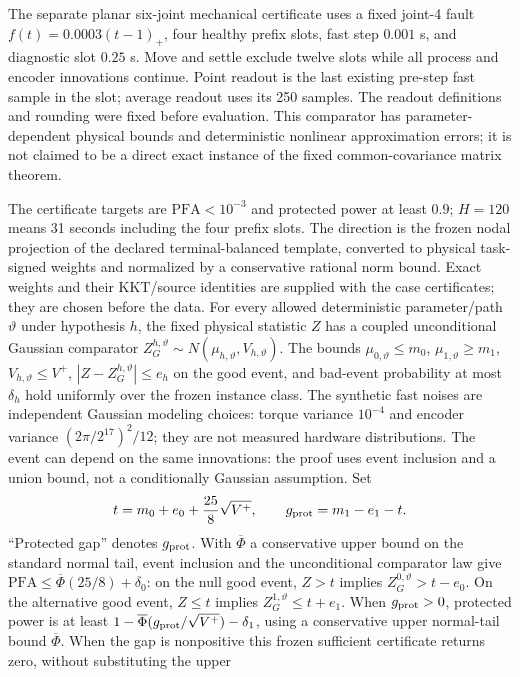 The separate planar six-joint mechanical certificate uses a fixed joint-4
fault $f(t)=0.0003(t-1)_+$, four healthy prefix slots, fast step $0.001$ s,
and diagnostic slot $0.25$ s. Move and settle exclude twelve slots while
all process and encoder innovations continue. Point readout is the last
existing pre-step fast sample in the slot; average readout uses its 250 samples.
The readout definitions and rounding were fixed before evaluation.
This comparator has parameter-dependent physical bounds and deterministic
nonlinear approximation errors; it is not claimed to be a direct exact
instance of the fixed common-covariance matrix theorem.


The certificate targets are $\mathrm{PFA}<10^{-3}$ and protected power
at least $0.9$; $H=120$ means 31 seconds including the four prefix slots.
The direction is the frozen nodal projection of the declared terminal-balanced
template, converted to physical task-signed weights and normalized by a
conservative rational norm bound. Exact weights and their KKT/source identities
are supplied with the case certificates; they are chosen before the data.
For every allowed deterministic parameter/path $\vartheta$ under hypothesis $h$,
the fixed physical statistic $Z$ has a coupled unconditional Gaussian comparator
$Z_G^{h,\vartheta}\sim N(\mu_{h,\vartheta},V_{h,\vartheta})$.
The bounds $\mu_{0,\vartheta}\le m_0$, $\mu_{1,\vartheta}\ge m_1$,
$V_{h,\vartheta}\le V^+$, $|Z-Z_G^{h,\vartheta}|\le e_h$ on the good event,
and bad-event probability at most $\delta_h$ hold uniformly over the frozen
instance class. The synthetic fast noises are independent Gaussian modeling
choices: torque variance $10^{-4}$ and encoder variance
$(2\pi/2^{17})^2/12$; they are not measured hardware distributions.
The event can depend on the same innovations: the proof uses event
inclusion and a union bound, not a conditionally Gaussian assumption.
Set
\[
t=m_0+e_0+\frac{25}{8}\sqrt{V^+},\qquad
g_{\rm prot}=m_1-e_1-t.
\]
``Protected gap'' denotes $g_{\rm prot}$. With $\overline\Phi$ a conservative upper bound on the standard normal tail,
event inclusion and the unconditional comparator law give
$\mathrm{PFA}\le\overline\Phi(25/8)+\delta_0$: on the null good event,
$Z>t$ implies $Z_G^{0,\vartheta}>t-e_0$.
On the alternative good event, $Z\le t$ implies
$Z_G^{1,\vartheta}\le t+e_1$. When $g_{\rm prot}>0$, protected power is at least
$1-\overline\Phi(g_{\rm prot}/\sqrt{V^+})-\delta_1$, using a conservative
upper normal-tail bound $\overline\Phi$. When the gap is nonpositive this
frozen sufficient certificate returns zero, without substituting the upper
